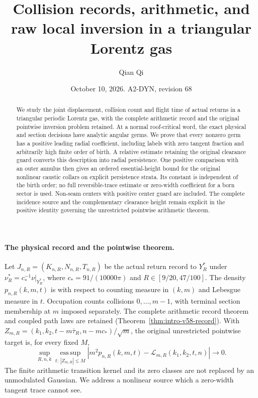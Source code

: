 \documentclass[11pt,reqno]{amsart}
\title[Collision records and raw local inversion]{Collision records, arithmetic, and raw local inversion in a triangular Lorentz gas}
\author{Qian Qi}
\date{October 10, 2026. A2-DYN, revision 68}
\numberwithin{equation}{section}
\theoremstyle{definition}\newtheorem{definition}[theorem]{Definition}
\theoremstyle{remark}\newtheorem{remark}[theorem]{Remark}
\begin{document}
\raggedbottom
\begin{abstract}
We study the joint displacement, collision count and flight time of
actual returns in a triangular periodic Lorentz gas, with the complete
arithmetic record and the original pointwise inversion problem retained.
At a normal roof-critical word, the exact physical and section decisions
have analytic angular germs. We prove that every nonzero germ has a
positive leading radial coefficient, including labels with zero tangent
fraction and arbitrarily high finite order of birth. A relative estimate
retaining the original clearance guard converts this description into
radial persistence. One positive comparison with an outer annulus then
gives an ordered essential-height bound for the original nonlinear
caustic collars on explicit persistence strata. Its constant is
independent of the birth order; no full reversible-trace estimate or
zero-width coefficient for a born sector is used. Non-seam centers with
positive center guard are included. The complete incidence source and
the complementary clearance height remain explicit in the positive
identity governing the unrestricted pointwise arithmetic theorem.
\end{abstract}
\maketitle

\paragraph{The physical record and the pointwise theorem.}
Let $J_{n,R}=(K_{n,R},N_{n,R},T_{n,R})$ be the actual return record
to $Y_R^*$ under $\nu_R^*=c_*^{-1}\nu|_{Y_R^*}$, where
$c_*=91/(10000\pi)$ and $R\in[9/20,47/100]$.
The density $p_{n,R}(k,m,t)$ is with respect to counting measure in
$(k,m)$ and Lebesgue measure in $t$. Occupation counts collisions
$0,\ldots,m-1$, with terminal section membership at $m$ imposed
separately. The complete arithmetic record theorem and coupled path
laws are retained (Theorem~\ref{thm:intro-v58-record}). With
$Z_{m,R}=(k_1,k_2,t-m\bar\tau_R,n-mc_*)/\sqrt m$, the original
unrestricted pointwise target is, for every fixed $M$,
\begin{equation}\label{eq:intro-v68-pointwise-target}
 \sup_{R,n,k}\operatorname*{ess\,sup}_{t:\,|Z_{m,R}|\le M}
 \left|m^2p_{n,R}(k,m,t)-\mathcal L_{m,R}(k_1,k_2,t,n)\right|
                                     \longrightarrow0.
\end{equation}
The finite arithmetic transition kernel and its zero classes are not
replaced by an unmodulated Gaussian. We address a nonlinear source
which a zero-width tangent trace cannot see.
\end{document}
